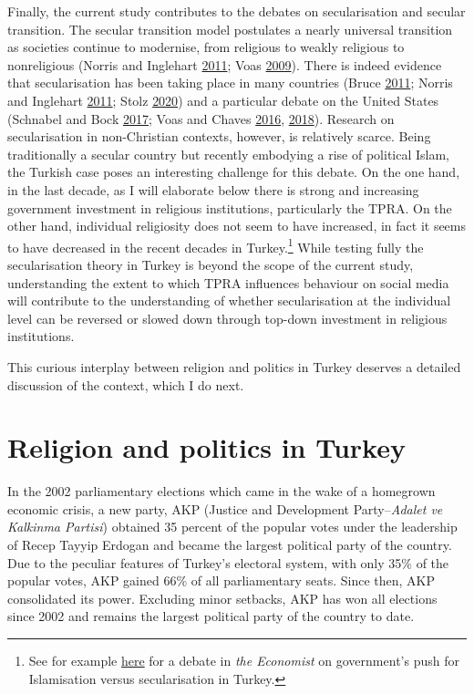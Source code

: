 \documentclass[
  12pt,
]{article}
\begin{document}
Finally, the current study contributes to the debates on secularisation and secular transition. The secular transition model postulates a nearly universal transition as societies continue to modernise, from religious to weakly religious to nonreligious (Norris and Inglehart \protect\hyperlink{ref-norris2011sacred}{2011}; Voas \protect\hyperlink{ref-voas2009rise}{2009}). There is indeed evidence that secularisation has been taking place in many countries (Bruce \protect\hyperlink{ref-bruce2011sec}{2011}; Norris and Inglehart \protect\hyperlink{ref-norris2011sacred}{2011}; Stolz \protect\hyperlink{ref-Sto20}{2020}) and a particular debate on the United States (Schnabel and Bock \protect\hyperlink{ref-schnabel2017persistent}{2017}; Voas and Chaves \protect\hyperlink{ref-voas2016united}{2016}, \protect\hyperlink{ref-voas2018even}{2018}). Research on secularisation in non-Christian contexts, however, is relatively scarce. Being traditionally a secular country but recently embodying a rise of political Islam, the Turkish case poses an interesting challenge for this debate. On the one hand, in the last decade, as I will elaborate below there is strong and increasing government investment in religious institutions, particularly the TPRA. On the other hand, individual religiosity does not seem to have increased, in fact it seems to have decreased in the recent decades in Turkey.\footnote{See for example \href{https://www.economist.com/erasmus/2019/07/01/in-turkey-demography-is-a-brake-on-islamisation}{here} for a debate in \emph{the Economist} on government's push for Islamisation versus secularisation in Turkey.}
While testing fully the secularisation theory in Turkey is beyond the scope of the current study, understanding the extent to which TPRA influences behaviour on social media will contribute to the understanding of whether secularisation at the individual level can be reversed or slowed down through top-down investment in religious institutions.

This curious interplay between religion and politics in Turkey deserves a detailed discussion of the context, which I do next.

\hypertarget{religion-and-politics-in-turkey}{%
\section{Religion and politics in Turkey}\label{religion-and-politics-in-turkey}}

In the 2002 parliamentary elections which came in the wake of a homegrown economic crisis, a new party, AKP (Justice and Development Party--\emph{Adalet ve Kalkinma Partisi}) obtained 35 percent of the popular votes under the leadership of Recep Tayyip Erdogan and became the largest political party of the country. Due to the peculiar features of Turkey's electoral system, with only 35\% of the popular votes, AKP gained 66\% of all parliamentary seats. Since then, AKP consolidated its power. Excluding minor setbacks, AKP has won all elections since 2002 and remains the largest political party of the country to date.
\end{document}
